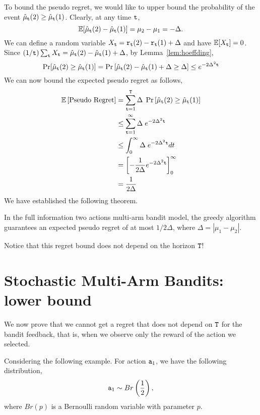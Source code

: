 To bound the pseudo regret, we would like  to upper bound the probability of the event $\hat{\mu}_{{\tt t}}(2)\ge \hat{\mu}_{{\tt t}}(1)$. 
Clearly, at any time ${\tt t}$,
\[
\mathbb{E}[\hat{\mu}_{{\tt t}}(2)-\hat{\mu}_{{\tt t}}(1)]=\mu_{2}-\mu_{1}=-\Delta.
\]
We can define a random variable $X_{{\tt t}}={\tt r}_{{\tt t}}(2)-{\tt r}_{{\tt t}}(1)+\Delta$ and have $\mathbb{E}[X_{{\tt t}}]=0$. Since $(1/{\tt t})\sum_{{\tt t}} X_{{\tt t}} = \hat{\mu}_{{\tt t}}(2)- \hat{\mu}_{{\tt t}}(1)+\Delta$, by
Lemma~\ref{lem:hoeffding},
\[
\Pr[\hat{\mu}_{\tt t}(2)\geq \hat{\mu}_{\tt t}(1)]= \Pr\left[\hat{\mu}_{{\tt t}}(2)-\hat{\mu}_{{\tt t}}(1)+\Delta
\ge\Delta\right]\le e^{-2\Delta^{2}{\tt t}}
\]
We can now bound the expected pseudo regret as follows,
\begin{align*}
\mathbb{E}\left[\text{Pseudo Regret}\right] & = 
 \sum_{{\tt t}=1}^{{\tt T}}\Delta\;\Pr\left[\hat{\mu}_{\tt t}(2)\geq \hat{\mu}_{\tt t}(1)\right]\\
 & \le   \sum_{{\tt t}=1}^{\infty}\Delta \; e^{-2\Delta^{2}{\tt t}}\\
 & \le  \int_{0}^{\infty}\Delta\; e^{-2\Delta^{2}{\tt t}}dt\\
 & =  \left[-\frac{1}{2\Delta}e^{-2\Delta^{2}{\tt t}}\right]_{0}^{\infty}\\
 & =  \frac{1}{2\Delta}
\end{align*}
We have established the following theorem.
\begin{theorem}
In the full information two actions multi-arm bandit model, the greedy algorithm guarantees an expected pseudo regret of at most $1/2\Delta$, where $\Delta=|\mu_1-\mu_2|$.
\end{theorem}

Notice that this regret bound does not depend on  the horizon ${\tt T}$!

\section{Stochastic Multi-Arm Bandits: lower bound}


We now prove that we cannot get a regret that does not depend on ${\tt T}$ for the bandit feedback, that is, when we observe only the reward of the action we selected.

Considering the following example. For action ${\tt a}_1$, we have the following distribution,
\[
{\tt a}_{1}\sim Br\left(\frac{1}{2}\right),\]
where $Br(p)$ is a Bernoulli random variable with parameter $p$.

